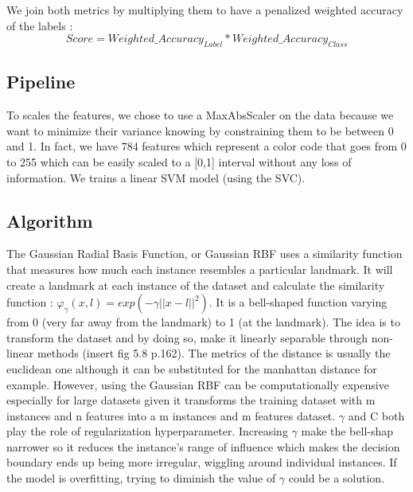 We join both metrics by multiplying them to have a penalized weighted accuracy of the labels : 
\begin{equation*}
	Score = Weighted\_Accuracy_{Label} *  Weighted\_Accuracy_{Class}
\end{equation*}

\subsection{Pipeline}
To scales the features, we chose to use a MaxAbsScaler on the data because we want to minimize their variance knowing by constraining them to be between 0 and 1. In fact, we have 784 features which represent a color code that goes from 0 to 255 which can be easily scaled to a [0,1] interval without any loss of information. We trains a linear SVM model (using the SVC). 

\subsection{Algorithm}
The Gaussian Radial Basis Function, or Gaussian RBF uses a similarity function that measures how much each instance resembles a particular landmark. It will create a landmark at each instance of the dataset and calculate the similarity function :  $\varphi_\gamma(x,l)= exp (-\gamma ||x-l||^2)$.
It is a bell-shaped function varying from 0 (very far away from the landmark) to 1 (at the landmark). The idea is to transform the dataset and by doing so, make it linearly separable through non-linear methods (insert fig 5.8 p.162).
The metrics of the distance is usually the euclidean one although it can be substituted for the manhattan distance for example. 
However, using the Gaussian RBF can be computationally expensive especially for large datasets given it transforms the training dataset with m instances and n features into a m instances and m features dataset.
$\gamma$ and C both play the role of regularization hyperparameter. Increasing $\gamma$ make the bell-shap narrower so it reduces the instance's range of influence which makes the decision boundary ends up being more irregular, wiggling around individual instances.
If the model is overfitting, trying to diminish the value of $\gamma$ could be a solution.
